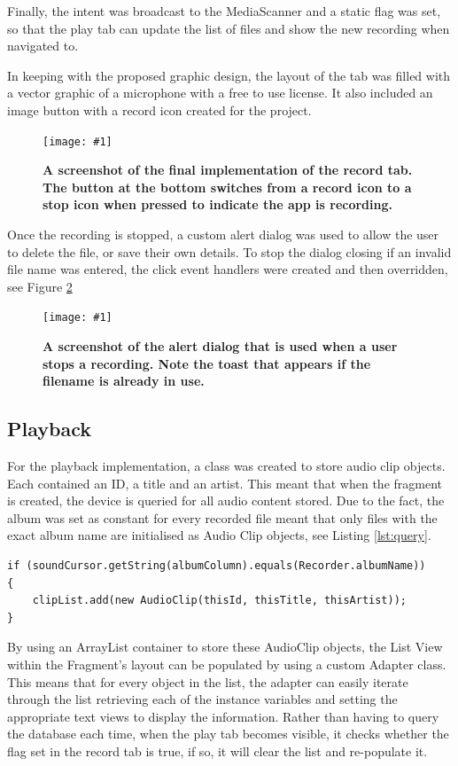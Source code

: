 \documentclass[conference]{acmsiggraph}
\newcommand{\figuremacroF}[3]{
	\begin{figure}[H] %
		\centering
		\texttt{[image: \#1]}
		\caption[#2]{\textbf{#2}}
		\label{fig:#1}
	\end{figure}
}
\begin{document}
Finally, the intent was broadcast to the MediaScanner and a static flag was set, so that the play tab can update the list of files and show the new recording when navigated to.

In keeping with the proposed graphic design, the layout of the tab was filled with a vector graphic of a microphone with a free to use license. \cite{microphone} It also included an image button with a record icon created for the project.

\figuremacroF
{PlayTabSS}
{A screenshot of the final implementation of the record tab. The button at the bottom switches from a record icon to a stop icon when pressed to indicate the app is recording.}
{1.0}

Once the recording is stopped, a custom alert dialog was used to allow the user to delete the file, or save their own details. To stop the dialog closing if an invalid file name was entered, the click event handlers were created and then overridden, see Figure \ref{fig:dialog}

\figuremacroF
{dialog}
{A screenshot of the alert dialog that is used when a user stops a recording. Note the toast that appears if the filename is already in use.}
{1.0}

\subsection{Playback}

For the playback implementation, a class was created to store audio clip objects. Each contained an ID, a title and an artist. This meant that when the fragment is created, the device is queried for all audio content stored. Due to the fact, the album was set as constant for every recorded file meant that only files with the exact album name are initialised as Audio Clip objects, see Listing \ref{lst:query}.

\begin{lstlisting}[label = {lst:query}, caption={Conditional Statement for Creating Audio Clips}]
if (soundCursor.getString(albumColumn).equals(Recorder.albumName))
{
	clipList.add(new AudioClip(thisId, thisTitle, thisArtist));
}
\end{lstlisting}

By using an ArrayList container to store these AudioClip objects, the List View within the Fragment's layout can be populated by using a custom Adapter class. This means that for every object in the list, the adapter can easily iterate through the list retrieving each of the instance variables and setting the appropriate text views to display the information. Rather than having to query the database each time, when the play tab becomes visible, it checks whether the flag set in the record tab is true, if so, it will clear the list and re-populate it. 
\end{document}

